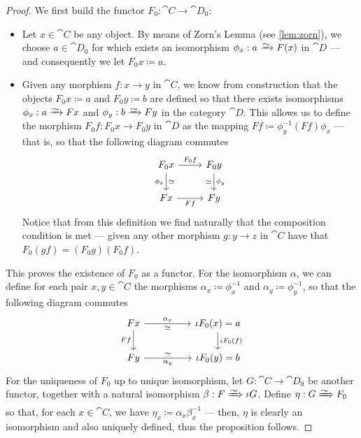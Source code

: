 \begin{proof}
    We first build the functor \(F_0: \cat C \to \cat D_0\):
    \begin{itemize}\setlength\itemsep{0em}
        \item Let \(x \in \cat C\) be any object. By means of Zorn's Lemma (see
              \cref{lem:zorn}), we choose \(a \in \cat D_0\) for which exists an
              isomorphism \(\phi_x: a \isoto F(x)\) in \(\cat D\) --- and consequently we let
              \(F_0 x \coloneq a\).
        \item Given any morphism \(f: x \to y\) in \(\cat C\), we know from
              construction that the objects \(F_0 x \coloneq a\) and \(F_0 y \coloneq b\)
              are defined so that there exists isomorphisms \(\phi_x: a \isoto F x\) and
              \(\phi_y: b \isoto F y\) in the category \(\cat D\). This allows us to define
              the morphism \(F_0 f: F_0 x \to F_0 y\) in \(\cat D\) as the mapping
              \(F f \coloneq \phi_y^{-1} (F f) \phi_x\) --- that is, so that the following
              diagram commutes
              \[
                  \begin{tikzcd}
                      F_0 x \ar[r, "F_0 f"] \ar[d, "\dis", "\phi_x"']
                      &F_0 y \ar[d, "\dis"', "\phi_y"] \\
                      F x \ar[r, swap, "F f"] &F y
                  \end{tikzcd}
              \]
              Notice that from this definition we find naturally that the composition
              condition is met --- given any other morphism \(g: y \to z\) in \(\cat C\)
              have that \(F_0(g f) = (F_0 g)(F_0 f)\).
    \end{itemize}
    This proves the existence of \(F_0\) as a functor. For the isomorphism
    \(\alpha\), we can define for each pair \(x, y \in \cat C\) the morphisms
    \(\alpha_x \coloneq \phi_x^{-1}\) and \(\alpha_y \coloneq \phi_y^{-1}\), so that
    the following diagram commutes
    \[
        \begin{tikzcd}
            F x \ar[rr, "\alpha_x", "\dis"'] \ar[d, swap, "F f"]
            & &\iota F_0(x) = a \ar[d, "\iota F_0 (f)"] \\
            F y \ar[rr, "\alpha_y"', "\dis"]
            & &\iota F_0(y) = b
        \end{tikzcd}
    \]
    For the uniqueness of \(F_0\) up to unique isomorphism, let
    \(G: \cat C \to \cat D_0\) be another functor, together with a natural
    isomorphism \(\beta: F \isonat \iota G\). Define \(\eta: G \isonat F_0\) so
    that, for each \(x \in \cat C\), we have
    \(\eta_x \coloneq \alpha_x \beta_{x}^{-1}\) --- then, \(\eta\) is clearly an
    isomorphism and also uniquely defined, thus the proposition follows.
\end{proof}

